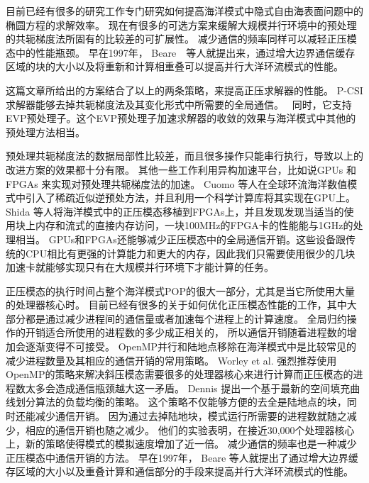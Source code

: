     
目前已经有很多的研究工作专门研究如何提高海洋模式中隐式自由海表面问题中的椭圆方程的求解效率。 
现在有很多的可选方案来缓解大规模并行环境中的预处理的共轭梯度法所固有的比较差的可扩展性。 
 减少通信的频率同样可以减轻正压模态中的性能瓶颈。 
 早在1997年，  Beare　\cite{beare1997optimisation}等人就提出来，通过增大边界通信缓存区域的块的大小以及将重新和计算相重叠可以提高并行大洋环流模式的性能。 
  

这篇文章所给出的方案结合了以上的两条策略，来提高正压求解器的性能。 
P-CSI求解器能够去掉共轭梯度法及其变化形式中所需要的全局通信。　
同时，它支持EVP预处理子。这个EVP预处理子加速求解器的收敛的效果与海洋模式中其他的预处理方法相当。 



预处理共轭梯度法的数据局部性比较差，而且很多操作只能串行执行，导致以上的改进方案的效果都十分有限。 
其他一些工作利用异构加速平台，比如说GPUs \cite{cuomo2012pcg} 和FPGAs \cite{Shida2007}来实现对预处理共轭梯度法的加速。 
Cuomo 等人\cite{cuomo2012pcg}在全球环流海洋数值模式中引入了稀疏近似逆预处方法，并且利用一个科学计算库将其实现在GPU上。 
Shida 等人\cite{Shida2007}将海洋模式中的正压模态移植到FPGAs上，并且发现发现当适当的使用块上内存和流式的直接内存访问，一块100MHz的FPGA卡的性能能与1GHz的处理相当。 
GPUs和FPGAs还能够减少正压模态中的全局通信开销。这些设备跟传统的CPU相比有更强的计算能力和更大的内存，因此我们只需要使用很少的几块加速卡就能够实现只有在大规模并行环境下才能计算的任务。


正压模态的执行时间占整个海洋模式POP的很大一部分，尤其是当它所使用大量的处理器核心时。
目前已经有很多的关于如何优化正压模态性能的工作，其中大部分都是通过减少进程间的通信量或者加速每个进程上的计算速度。 
全局归约操作的开销适合所使用的进程数的多少成正相关的， 所以通信开销随着进程数的增加会逐渐变得不可接受。
OpenMP并行和陆地点移除在海洋模式中是比较常见的减少进程数量及其相应的通信开销的常用策略。 
Worley et al. \cite{Worley:2011:PCE:2063384.2063457} 强烈推荐使用OpenMP的策略来解决斜压模态需要很多的处理器核心来进行计算而正压模态的进程数太多会造成通信瓶颈越大这一矛盾。 
Dennis \cite{dennis2007inverse,dennis2008scaling}提出一个基于最新的空间填充曲线划分算法的负载均衡的策略。 
这个策略不仅能够方便的去全是陆地点的块，同时还能减少通信开销。 因为通过去掉陆地块，模式运行所需要的进程数就随之减少，相应的通信开销也随之减少。 
他们的实验表明，在接近30,000个处理器核心上，新的策略使得模式的模拟速度增加了近一倍。 
减少通信的频率也是一种减少正压模态中通信开销的方法。 
早在1997年， Beare \cite{beare1997optimisation}等人就提出了通过增大边界缓存区域的大小以及重叠计算和通信部分的手段来提高并行大洋环流模式的性能。 



